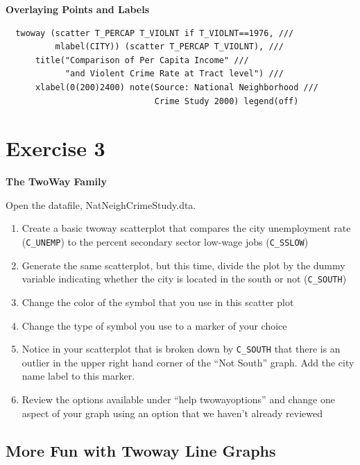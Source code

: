 \documentclass[]{book}
\providecommand{\tightlist}{%
  \setlength{\itemsep}{0pt}\setlength{\parskip}{0pt}}
\begin{document}
\textbf{Overlaying Points and Labels}

\begin{verbatim}
  twoway (scatter T_PERCAP T_VIOLNT if T_VIOLNT==1976, ///
          mlabel(CITY)) (scatter T_PERCAP T_VIOLNT), ///
      title("Comparison of Per Capita Income" ///
            "and Violent Crime Rate at Tract level") ///
      xlabel(0(200)2400) note(Source: National Neighborhood ///
                              Crime Study 2000) legend(off)
\end{verbatim}

\section{Exercise 3}\label{exercise-3-3}

\textbf{The TwoWay Family}

Open the datafile, NatNeighCrimeStudy.dta.

\begin{enumerate}
\def\labelenumi{\arabic{enumi}.}
\tightlist
\item
  Create a basic twoway scatterplot that compares the city unemployment
  rate (\texttt{C\_UNEMP}) to the percent secondary sector low-wage jobs
  (\texttt{C\_SSLOW})
\item
  Generate the same scatterplot, but this time, divide the plot by the
  dummy variable indicating whether the city is located in the south or
  not (\texttt{C\_SOUTH})
\item
  Change the color of the symbol that you use in this scatter plot
\item
  Change the type of symbol you use to a marker of your choice
\item
  Notice in your scatterplot that is broken down by \texttt{C\_SOUTH}
  that there is an outlier in the upper right hand corner of the ``Not
  South'' graph. Add the city name label to this marker.
\item
  Review the options available under ``help twowayoptions'' and change
  one aspect of your graph using an option that we haven't already
  reviewed
\end{enumerate}

\subsection{More Fun with Twoway Line
Graphs}\label{more-fun-with-twoway-line-graphs}
\end{document}
